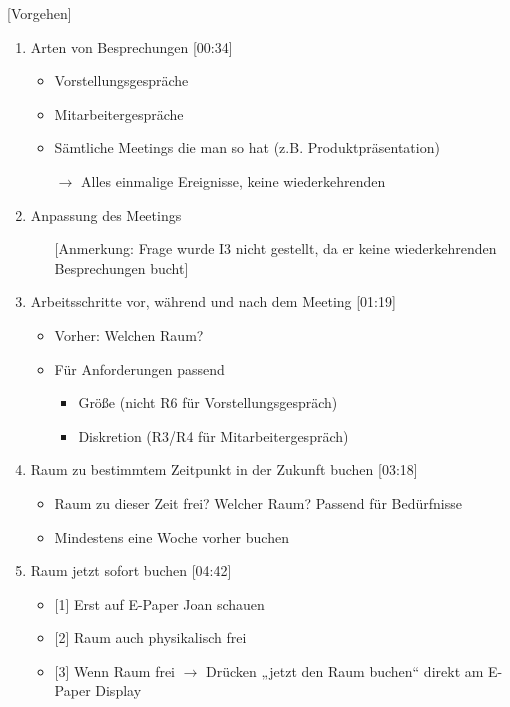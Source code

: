 [Vorgehen]

\begin{enumerate}

    \item Arten von Besprechungen [00:34]
    \begin{itemize}
        \item Vorstellungsgespräche
        \item Mitarbeitergespräche
        \item Sämtliche Meetings die man so hat (z.B. Produktpräsentation)
        \item[] $\rightarrow$ Alles einmalige Ereignisse, keine wiederkehrenden
    \end{itemize}
    
    \item Anpassung des Meetings
     \begin{itemize}
        \item[] [Anmerkung: Frage wurde I3 nicht gestellt, da er keine wiederkehrenden Besprechungen bucht]
    \end{itemize}
    
    \item Arbeitsschritte vor, während und nach dem Meeting [01:19]
     \begin{itemize}
        \item Vorher: Welchen Raum? 
        \item Für Anforderungen passend
        \begin{itemize}
            \item Größe (nicht R6 für Vorstellungsgespräch)
            \item Diskretion (R3/R4 für Mitarbeitergespräch)
        \end{itemize}
    \end{itemize}
    
    \item Raum zu bestimmtem Zeitpunkt in der Zukunft buchen [03:18]
     \begin{itemize}
        \item Raum zu dieser Zeit frei? Welcher Raum? Passend für Bedürfnisse
        \item Mindestens eine Woche vorher buchen
    \end{itemize}
    
    \item Raum jetzt sofort buchen [04:42]
     \begin{itemize}
        \item{} [1] Erst auf E-Paper Joan schauen
        \item{} [2] Raum auch physikalisch frei 
        \item{} [3] Wenn Raum frei $\rightarrow$ Drücken „jetzt den Raum buchen“ direkt am E-Paper Display 
    \end{itemize}
    

\end{enumerate}
